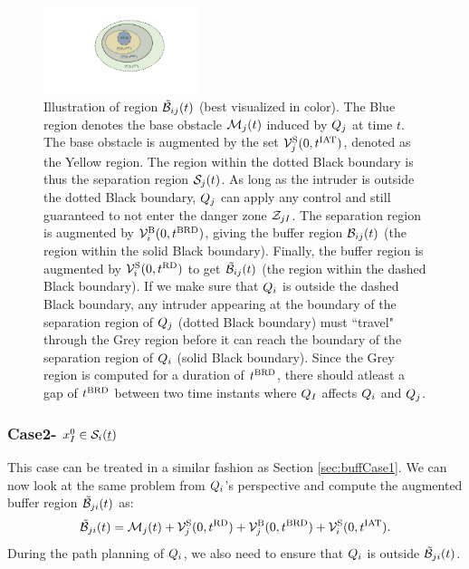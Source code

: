 \begin{figure}[H]
  \centering
  \includegraphics[width=0.4\textwidth]{"figs/buffRegion"}
  \caption{Illustration of region $\tilde{\mathcal{B}}_{ij}(t)$ (best visualized in color). The Blue region denotes the base obstacle $\mathcal{M}_j(t)$ induced by $Q_j$ at time $t$. The base obstacle is augmented by the set $\mathcal{V}^{\text{S}}_{j}(0, t^\text{IAT})$, denoted as the Yellow region. The region within the dotted Black boundary is thus the separation region $\mathcal{S}_j(t)$. As long as the intruder is outside the dotted Black boundary, $Q_j$ can apply any control and still guaranteed to not enter the danger zone $\mathcal{Z}_{jI}$. The separation region is augmented by $\mathcal{V}^{\text{B}}_{i}(0, t^\text{BRD})$, giving the buffer region $\mathcal{B}_{ij}(t)$ (the region within the solid Black boundary). Finally, the buffer region is augmented by $\mathcal{V}^{\text{S}}_{i}(0, t^\text{RD})$ to get $\tilde{\mathcal{B}}_{ij}(t)$ (the region within the dashed Black boundary). If we make sure that $Q_i$ is outside the dashed Black boundary, any intruder appearing at the boundary of the separation region of $Q_j$ (dotted Black boundary) must ``travel" through the Grey region before it can reach the boundary of the separation region of $Q_i$ (solid Black boundary). Since the Grey region is computed for a duration of $t^\text{BRD}$, there should atleast a gap of $t^\text{BRD}$ between two time instants where $Q_{I}$  affects $Q_i$ and $Q_j$.}
  \label{fig:buffRegion}
\end{figure}

\subsubsection{Case2- $x_{I}^0 \in \mathcal{S}_i(\underline{t})$} \label{sec:buffCase2}
This case can be treated in a similar fashion as Section \ref{sec:buffCase1}. We can now look at the same problem from $Q_i$'s perspective and compute the augmented buffer region $\tilde{\mathcal{B}}_{ji}(t)$ as:
\begin{equation} \label{eqn:augbuffRegion2}
\tilde{\buff}_{ji}(t) = \boset_j(t) + \brs^{\text{S}}_{j}(0, \trd) + \brs^{\text{B}}_{j}(0, \brd) + \brs^{\text{S}}_{i}(0, \iat).
\end{equation}
During the path planning of $Q_i$, we also need to ensure that $Q_i$ is outside $\tilde{\mathcal{B}}_{ji}(t)$. 